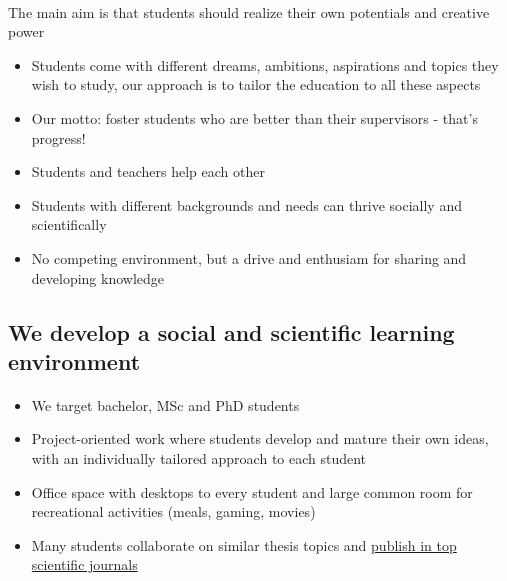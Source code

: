 \documentclass[%
oneside,                 %
final,                   %
10pt]{article}
\begin{document}
\paragraph{}
The main aim is that students should realize their own potentials and creative power

\begin{itemize}
 \item Students come with different dreams, ambitions, aspirations and topics they wish to study, our approach is to tailor the education to all these aspects

 \item Our motto: foster students who are better than their supervisors - that's progress!

 \item Students and teachers help each other

 \item Students with different backgrounds and needs can thrive socially and scientifically

 \item No competing environment, but a drive and enthusiam for sharing and developing knowledge
\end{itemize}

\noindent





\subsection{We develop a social and scientific learning environment}


\paragraph{}
\begin{itemize}
\item We target bachelor, MSc and PhD students

\item Project-oriented work where students develop and mature their own ideas, with an individually tailored approach to each student

\item Office space with desktops to every student and large common room for recreational activities (meals, gaming, movies)

\item Many students collaborate on similar  thesis topics and \href{{http://www.dn.no/talent/2014/06/12/Utdannelse/sommervikar-ble-toppforsker}}{publish in top scientific journals}
\end{itemize}
\end{document}
